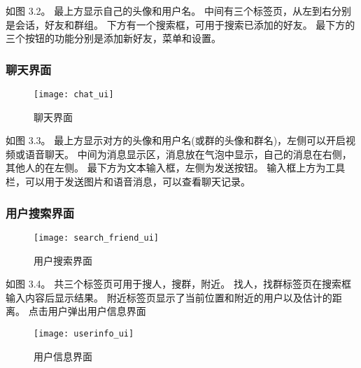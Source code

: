 如图 3.2。
最上方显示自己的头像和用户名。
中间有三个标签页，从左到右分别是会话，好友和群组。
下方有一个搜索框，可用于搜索已添加的好友。
最下方的三个按钮的功能分别是添加新好友，菜单和设置。

\subsubsection{聊天界面}
\begin{figure}[h]
	\centering
	\texttt{[image: chat\_ui]}
	\caption{聊天界面} \label{fig:chat_ui}
\end{figure}


如图 3.3。
最上方显示对方的头像和用户名(或群的头像和群名)，左侧可以开启视频或语音聊天。
中间为消息显示区，消息放在气泡中显示，自己的消息在右侧，其他人的在左侧。
最下方为文本输入框，左侧为发送按钮。
输入框上方为工具栏，可以用于发送图片和语音消息，可以查看聊天记录。

\subsubsection{用户搜索界面}
\begin{figure}[h]
	\centering
	\texttt{[image: search\_friend\_ui]}
	\caption{用户搜索界面} \label{fig:search_friend_ui}
\end{figure}

如图 3.4。
共三个标签页可用于搜人，搜群，附近。
找人，找群标签页在搜索框输入内容后显示结果。
附近标签页显示了当前位置和附近的用户以及估计的距离。
点击用户弹出用户信息界面

\begin{figure}[h]
	\centering
	\texttt{[image: userinfo\_ui]}
	\caption{用户信息界面} \label{fig:userinfo_ui}
\end{figure}


